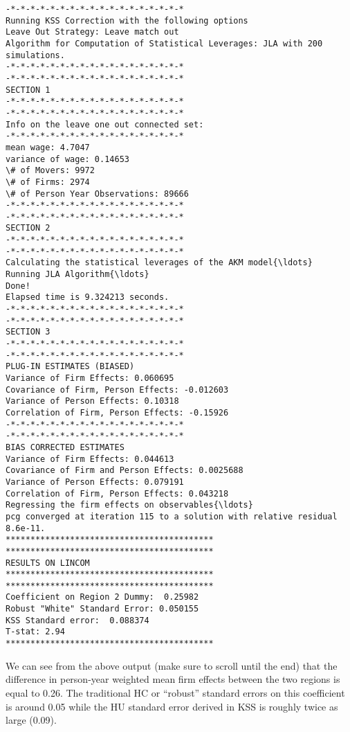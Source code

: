 \documentclass[11pt]{article}
\begin{document}
    \begin{Verbatim}[commandchars=\\\{\}]
-*-*-*-*-*-*-*-*-*-*-*-*-*-*-*-*-*-*
Running KSS Correction with the following options
Leave Out Strategy: Leave match out
Algorithm for Computation of Statistical Leverages: JLA with 200 simulations.
-*-*-*-*-*-*-*-*-*-*-*-*-*-*-*-*-*-*
-*-*-*-*-*-*-*-*-*-*-*-*-*-*-*-*-*-*
SECTION 1
-*-*-*-*-*-*-*-*-*-*-*-*-*-*-*-*-*-*
-*-*-*-*-*-*-*-*-*-*-*-*-*-*-*-*-*-*
Info on the leave one out connected set:
-*-*-*-*-*-*-*-*-*-*-*-*-*-*-*-*-*-*
mean wage: 4.7047
variance of wage: 0.14653
\# of Movers: 9972
\# of Firms: 2974
\# of Person Year Observations: 89666
-*-*-*-*-*-*-*-*-*-*-*-*-*-*-*-*-*-*
-*-*-*-*-*-*-*-*-*-*-*-*-*-*-*-*-*-*
SECTION 2
-*-*-*-*-*-*-*-*-*-*-*-*-*-*-*-*-*-*
-*-*-*-*-*-*-*-*-*-*-*-*-*-*-*-*-*-*
Calculating the statistical leverages of the AKM model{\ldots}
Running JLA Algorithm{\ldots}
Done!
Elapsed time is 9.324213 seconds.
-*-*-*-*-*-*-*-*-*-*-*-*-*-*-*-*-*-*
-*-*-*-*-*-*-*-*-*-*-*-*-*-*-*-*-*-*
SECTION 3
-*-*-*-*-*-*-*-*-*-*-*-*-*-*-*-*-*-*
-*-*-*-*-*-*-*-*-*-*-*-*-*-*-*-*-*-*
PLUG-IN ESTIMATES (BIASED)
Variance of Firm Effects: 0.060695
Covariance of Firm, Person Effects: -0.012603
Variance of Person Effects: 0.10318
Correlation of Firm, Person Effects: -0.15926
-*-*-*-*-*-*-*-*-*-*-*-*-*-*-*-*-*-*
-*-*-*-*-*-*-*-*-*-*-*-*-*-*-*-*-*-*
BIAS CORRECTED ESTIMATES
Variance of Firm Effects: 0.044613
Covariance of Firm and Person Effects: 0.0025688
Variance of Person Effects: 0.079191
Correlation of Firm, Person Effects: 0.043218
Regressing the firm effects on observables{\ldots}
pcg converged at iteration 115 to a solution with relative residual 8.6e-11.
******************************************
******************************************
RESULTS ON LINCOM
******************************************
******************************************
Coefficient on Region 2 Dummy:  0.25982
Robust "White" Standard Error: 0.050155
KSS Standard error:  0.088374
T-stat: 2.94
******************************************
    \end{Verbatim}

    We can see from the above output  (make sure to scroll until the end)
that the difference in person-year weighted mean firm effects between
the two regions is equal to 0.26. The traditional
HC or ``robust'' standard errors on this
coefficient is around 0.05 while the HU standard error derived in KSS is
roughly twice as large (0.09).


    
    
\end{document}
